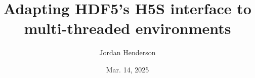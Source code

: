 \documentclass[letterpaper,rfc,hyper]{HDF5_RFC}
\title{Adapting HDF5's H5S interface to multi-threaded environments}
\author{Jordan Henderson}
\date{Mar. 14, 2025}
\begin{document}
\maketitle



\newpage
\tableofcontents

\newpage




%



\makerevisions




\appendix




\end{document}
